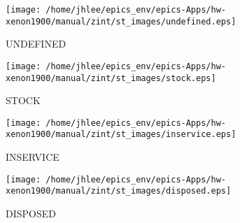 \noindent
\vspace{1cm}
\begin{minipage}{.2\textwidth}
\begin{center}
\texttt{[image: /home/jhlee/epics\_env/epics-Apps/hw-xenon1900/manual/zint/st\_images/undefined.eps]}
\end{center}
\end{minipage}
\begin{minipage}{.7\textwidth}
UNDEFINED
\end{minipage}


\noindent
\vspace{1cm}
\begin{minipage}{.2\textwidth}
\begin{center}
\texttt{[image: /home/jhlee/epics\_env/epics-Apps/hw-xenon1900/manual/zint/st\_images/stock.eps]}
\end{center}
\end{minipage}
\begin{minipage}{.7\textwidth}
STOCK
\end{minipage}


\noindent
\vspace{1cm}
\begin{minipage}{.2\textwidth}
\begin{center}
\texttt{[image: /home/jhlee/epics\_env/epics-Apps/hw-xenon1900/manual/zint/st\_images/inservice.eps]}
\end{center}
\end{minipage}
\begin{minipage}{.7\textwidth}
INSERVICE
\end{minipage}


\noindent
\vspace{1cm}
\begin{minipage}{.2\textwidth}
\begin{center}
\texttt{[image: /home/jhlee/epics\_env/epics-Apps/hw-xenon1900/manual/zint/st\_images/disposed.eps]}
\end{center}
\end{minipage}
\begin{minipage}{.7\textwidth}
DISPOSED
\end{minipage}


